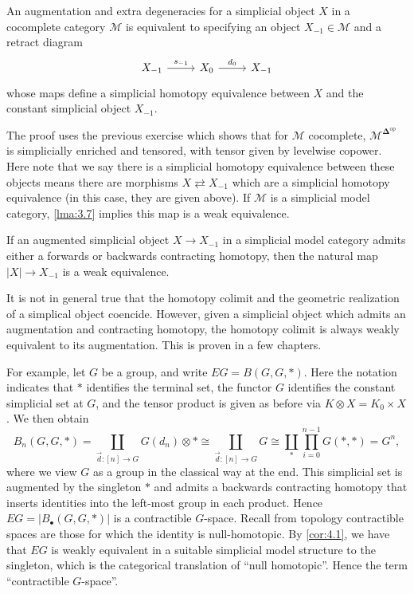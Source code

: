 \begin{lemma}\label{lma:4.3}
	An augmentation and extra degeneracies for a simplicial object $X$ in a cocomplete category $\mathcal{M} $ is equivalent to specifying an object $X_{-1} \in \mathcal{M} $ and a retract diagram
	\[\begin{tikzcd}[row sep = 2.5em, column sep = 2.5em]
	X_{-1} \ar[" s_{-1}  ", r]  & X_0\ar[" d_{0}  ", r]  & X_{-1} 
	\end{tikzcd}\]
	whose maps define a simplicial homotopy equivalence between $X$ and the constant simplicial object $X_{-1} $.
\end{lemma}
The proof uses the previous exercise which shows that for $\mathcal{M} $ cocomplete, $\mathcal{M} ^{\boldsymbol{\Delta} ^{\mathrm{op}} } $ is simplicially enriched and tensored, with tensor given by levelwise copower. Here note that we say there is a simplicial homotopy equivalence between these objects means there are morphisms $X\rightleftarrows X_{-1} $ which are a simplicial homotopy equivalence (in this case, they are given above). If $\mathcal{M} $ is a simplicial model category, \cref{lma:3.7} implies this map is a weak equivalence.

\begin{corollary}\label{cor:4.1}
	If an augmented simplicial object $X\to X_{-1} $ in a simplicial model category admits either a forwards or backwards contracting homotopy, then the natural map $\left| X \right| \to X_{-1} $ is a weak equivalence.
\end{corollary}

\begin{remark}
	It is not in general true that the homotopy colimit and the geometric realization of a simplical object coencide. However, given a simplicial object which admits an augmentation and contracting homotopy, the homotopy colimit is always weakly equivalent to its augmentation. This is proven in a few chapters.
\end{remark}

For example, let $G$ be a group, and write $EG=B(G,G,*)$. Here the notation indicates that $*$ identifies the terminal set, the functor $G$ identifies the constant simplicial set at $G$, and the tensor product is given as before via $K\otimes X=K_0\times X$. We then obtain
\[
	B_n(G,G,*)=\coprod_{\vec{d} : [n] \to G} G(d_n)\otimes *\cong \coprod_{\vec{d} : [n] \to G} G\cong \coprod_{*} \prod_{i=0}^{n-1} G(*,*)=G^n,
\]
where we view $G$ as a group in the classical way at the end. This simplicial set is augmented by the singleton $*$ and admits a backwards contracting homotopy that inserts identities into the left-most group in each product. Hence $EG=\left| B_{\bullet} (G,G,*) \right| $ is a contractible $G$-space. Recall from topology contractible spaces are those for which the identity is null-homotopic. By \cref{cor:4.1}, we have that $EG$ is weakly equivalent in a suitable simplicial model structure to the singleton, which is the categorical translation of ``null homotopic''. Hence the term ``contractible $G$-space''.

